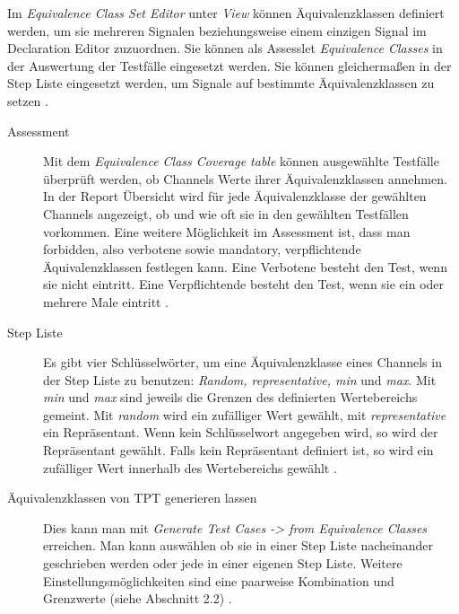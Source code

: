 Im \textit{Equivalence Class Set Editor} unter \textit{View} können Äquivalenzklassen definiert werden, um sie 
mehreren Signalen beziehungsweise einem einzigen Signal im Declaration Editor zuzuordnen.
Sie können als Assesslet \textit{Equivalence Classes} in der Auswertung der Testfälle eingesetzt werden.
Sie können gleichermaßen in der Step Liste eingesetzt werden, um
Signale auf bestimmte Äquivalenzklassen zu setzen \parencite[S. 370 ff.]{userguide}.\\
\begin{description}
\item[Assessment]%
Mit dem \textit{Equivalence Class Coverage table} können
ausgewählte Testfälle überprüft werden, ob Channels Werte ihrer Äquivalenzklassen
annehmen. In der Report Übersicht wird für jede Äquivalenzklasse der 
gewählten Channels angezeigt, ob und wie oft sie in den gewählten Testfällen vorkommen.
Eine weitere Möglichkeit im Assessment ist, dass 
man forbidden, also verbotene sowie mandatory, verpflichtende
Äquivalenzklassen festlegen kann. Eine Verbotene
besteht den Test, wenn sie nicht eintritt.
Eine Verpflichtende besteht den Test, wenn sie ein
oder mehrere Male eintritt \parencite[S. 1282 ff.]{userguide}.\\
\item[Step Liste]%
Es gibt vier Schlüsselwörter, um eine Äquivalenzklasse eines Channels
in der Step Liste zu benutzen: \textit{Random, representative, min} und \textit{max}.
Mit \textit{min} und \textit{max} sind jeweils die Grenzen des definierten Wertebereichs gemeint. Mit \textit{random} wird ein zufälliger Wert gewählt, mit \textit{representative} ein Repräsentant.
Wenn kein Schlüsselwort angegeben wird, so wird der Repräsentant gewählt.
Falls kein Repräsentant definiert ist, so wird ein zufälliger Wert innerhalb des Wertebereichs
gewählt \parencite[S. 379 f.]{userguide}.\\
\item[Äquivalenzklassen von TPT generieren lassen]
Dies kann man mit \textit{Generate Test Cases -> from Equivalence Classes} erreichen.
Man kann auswählen ob sie in einer Step Liste nacheinander
geschrieben werden oder jede in einer 
eigenen Step Liste. Weitere Einstellungsmöglichkeiten sind eine paarweise Kombination und Grenzwerte (siehe Abschnitt 2.2) \parencite[S. 668 ff.]{userguide}. 
\end{description}
